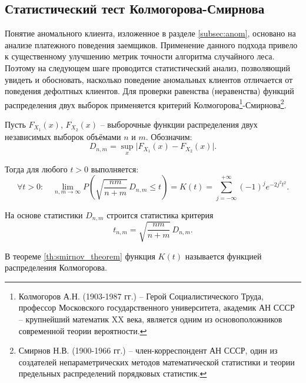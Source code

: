 \subsection{Статистический тест Колмогорова-Смирнова}

Понятие аномального клиента, изложенное в разделе \ref{subsec:anom}, основано на анализе платежного поведения заемщиков. Применение данного подхода привело к существенному улучшению метрик точности алгоритма случайного леса. Поэтому на следующем шаге проводится статистический анализ, позволяющий увидеть и обосновать, насколько поведение аномальных клиентов отличается от поведения дефолтных клиентов. Для проверки равенства (неравенства) функций распределения двух выборок применяется критерий Колмогорова\footnote{Колмогоров А.Н. (1903-1987 гг.) -- Герой Социалистического Труда, профессор Московского государственного университета, академик АН СССР -- крупнейший математик XX века, является одним из основоположников современной теории вероятности.}-Смирнова\footnote{Смирнов Н.В. (1900-1966 гг.) -- член-корреспондент АН СССР, один из создателей непараметрических методов математической статистики и теории предельных распределений порядковых статистик.}.

\begin{theorem}  
\label{th:smirnov_theorem}
Пусть $F_{X_1}(x)$, $F_{X_2}(x)$ -- выборочные функции распределения
двух независимых выборок объёмами $n$ и $m$. Обозначим:
\[
D_{n,m} = \sup_x \bigl| F_{X_1}(x) - F_{X_2}(x) \bigr|.
\]
\end{theorem}

Тогда для любого $t>0$ выполняется:
\begin{equation}
\label{eq:smirnov}
\forall t>0:\quad
\lim_{n,m\to\infty}
P\!\left(
\sqrt{\frac{nm}{n+m}}\, D_{n,m} \le t
\right)
= K(t)
= \sum_{j=-\infty}^{+\infty} (-1)^j e^{-2 j^2 t^2}.
\end{equation}

На основе статистики $D_{n,m}$ строится статистика критерия
\[
t_{n,m} = \sqrt{\frac{nm}{n+m}}\, D_{n,m}.
\]

В теореме \ref{th:smirnov_theorem} функция $K(t)$ называется функцией распределения Колмогорова.


